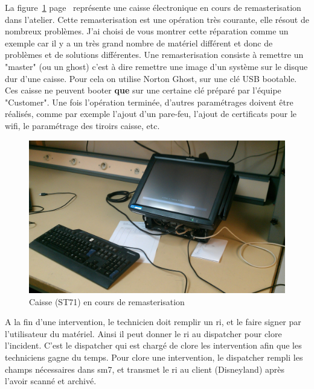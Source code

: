 La figure~\ref{st71} page~\pageref{st71} représente une caisse électronique en cours de remasterisation dans l'atelier. Cette remasterisation est une opération très courante, elle résout de nombreux problèmes. J'ai choisi de vous montrer cette réparation comme un exemple car il y a un très grand nombre de matériel différent et donc de problèmes et de solutions différentes. 
Une remasterisation consiste à remettre un "master" (ou un ghost) c'est à dire remettre une image d'un système sur le disque dur d'une caisse. Pour cela on utilise Norton Ghost, sur une clé USB bootable. Ces caisse ne peuvent booter \textbf{que} sur une certaine clé préparé par l'équipe "Customer".
Une fois l'opération terminée, d'autres paramétrages doivent être réalisés, comme par exemple l’ajout d'un pare-feu, l'ajout de certificats pour le wifi, le paramétrage des tiroirs caisse, etc.
\begin{center}
  \begin{figure}[ht]
    \caption{\label{st71} Caisse (ST71) en cours de remasterisation}
    \includegraphics [width=1\textwidth]{images/st71.jpg}
  \end{figure}
\end{center}
A la fin d'une intervention, le technicien doit remplir un \gls{ri}, et le faire signer par l'utilisateur du matériel. Ainsi il peut donner le \gls{ri} au \gls{dispatcher} pour clore l'incident. C'est le \gls{dispatcher} qui est chargé de clore les intervention afin que les techniciens gagne du temps.
Pour clore une intervention, le \gls{dispatcher} rempli les champs nécessaires dans \gls{sm7}, et transmet le \gls{ri} au client (Disneyland) après l'avoir scanné et archivé.
